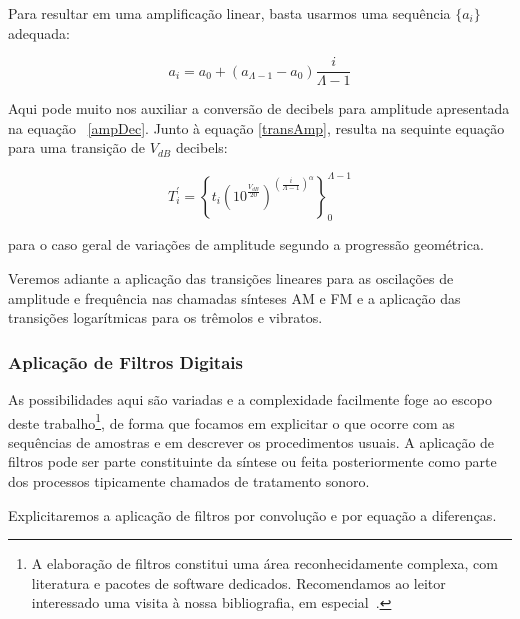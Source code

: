 Para resultar em uma amplificação linear, basta usarmos uma sequência $\{a_i\}$ adequada:

\begin{equation}
a_i=a_0 + (a_{\Lambda-1}-a_0)\frac{i}{\Lambda-1}
\end{equation}

Aqui pode muito nos auxiliar a conversão de decibels para amplitude apresentada na equação ~\ref{ampDec}.
Junto à equação \ref{transAmp}, resulta na sequinte equação para uma transição de $V_{dB}$ decibels:

\begin{equation}
T_i^{'}=\left \{ t_i (10^{\frac{V_{dB}}{20}} )^{\left ( \frac{i}{\Lambda-1} \right )^\alpha} \right \}_0^{\Lambda-1}
\end{equation}

para o caso geral de variações de amplitude segundo a progressão geométrica.

Veremos adiante a aplicação das transições lineares para as oscilações 
de amplitude e frequência nas chamadas sínteses AM e FM e a aplicação das transições
logarítmicas para os trêmolos e vibratos.

\subsubsection{Aplicação de Filtros Digitais}
 As possibilidades
aqui são variadas e a complexidade facilmente
foge ao escopo deste trabalho\footnote{A elaboração de filtros
constitui uma área reconhecidamente complexa, com literatura
e pacotes de software dedicados. 
Recomendamos ao leitor
interessado uma visita à nossa bibliografia, em especial~\cite{Openheim,smith}.},
de forma que focamos em explicitar o que ocorre com as sequências
de amostras e em descrever os procedimentos usuais.
A aplicação de filtros pode
ser parte constituinte da síntese ou feita posteriormente
como parte dos processos tipicamente chamados de tratamento sonoro.

Explicitaremos a aplicação de filtros por convolução
e por equação a diferenças.

